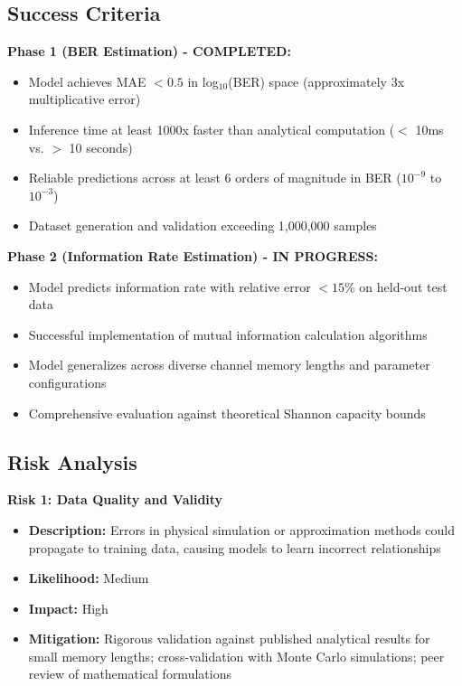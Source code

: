 \documentclass[a4paper,12pt]{report}
\begin{document}
\subsection{Success Criteria}

\textbf{Phase 1 (BER Estimation) - COMPLETED:}
\begin{itemize}
    \item Model achieves MAE $< 0.5$ in log$_{10}$(BER) space (approximately 3x multiplicative error)
    \item Inference time at least 1000x faster than analytical computation ($<$ 10ms vs. $>$ 10 seconds)
    \item Reliable predictions across at least 6 orders of magnitude in BER ($10^{-9}$ to $10^{-3}$)
    \item Dataset generation and validation exceeding 1,000,000 samples
\end{itemize}

\textbf{Phase 2 (Information Rate Estimation) - IN PROGRESS:}
\begin{itemize}
    \item Model predicts information rate with relative error $< 15\%$ on held-out test data
    \item Successful implementation of mutual information calculation algorithms
    \item Model generalizes across diverse channel memory lengths and parameter configurations
    \item Comprehensive evaluation against theoretical Shannon capacity bounds
\end{itemize}

\subsection{Risk Analysis}

\textbf{Risk 1: Data Quality and Validity}
\begin{itemize}
    \item \textbf{Description:} Errors in physical simulation or approximation methods could propagate to training data, causing models to learn incorrect relationships
    \item \textbf{Likelihood:} Medium
    \item \textbf{Impact:} High
    \item \textbf{Mitigation:} Rigorous validation against published analytical results for small memory lengths; cross-validation with Monte Carlo simulations; peer review of mathematical formulations
\end{itemize}
\end{document}
